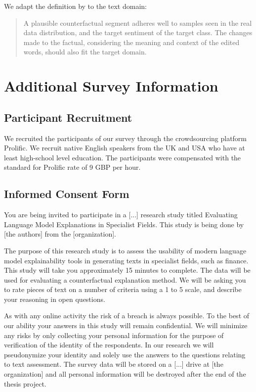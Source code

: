 \documentclass[11pt]{article}
\begin{document}
We adapt the definition by \citet{altmeyer_faithful_2024} to the text domain: 

\begin{quote}
    A plausible counterfactual segment adheres well to samples seen in the real data distribution, and the target sentiment of the target class. The changes made to the factual, considering the meaning and context of the edited words, should also fit the target domain.
\end{quote}

\section{Additional Survey Information}\label{appendix:additional_survey_information}

\subsection{Participant Recruitment}

We recruited the participants of our survey through the crowdsourcing platform Prolific. We recruit native English speakers from the UK and USA who have at least high-school level education. The participants were compensated with the standard for
Prolific rate of 9 GBP per hour.

\subsection{Informed Consent Form}\label{appendix:consent_form}

You are being invited to participate in a [...] research study titled Evaluating Language Model Explanations in Specialist Fields. This study is being done by [the authors] from the [organization].

The purpose of this research study is to assess the usability of modern language model explainability tools in generating texts in specialist fields, such as finance. This study will take you approximately 15 minutes to complete. The data will be used for evaluating a counterfactual explanation method. We will be asking you to rate pieces of text on a number of criteria using a 1 to 5 scale, and describe your reasoning in open questions.

As with any online activity the risk of a breach is always possible. To the best of our ability your answers in this study will remain confidential. We will minimize any risks by only collecting your personal information for the purpose of verification of the identity of the respondents. In our research we will pseudonymize your identity and solely use the answers to the questions relating to text assessment. The survey data will be stored on a [...] drive at [the organization] and all personal information will be destroyed after the end of the thesis project.
\end{document}
